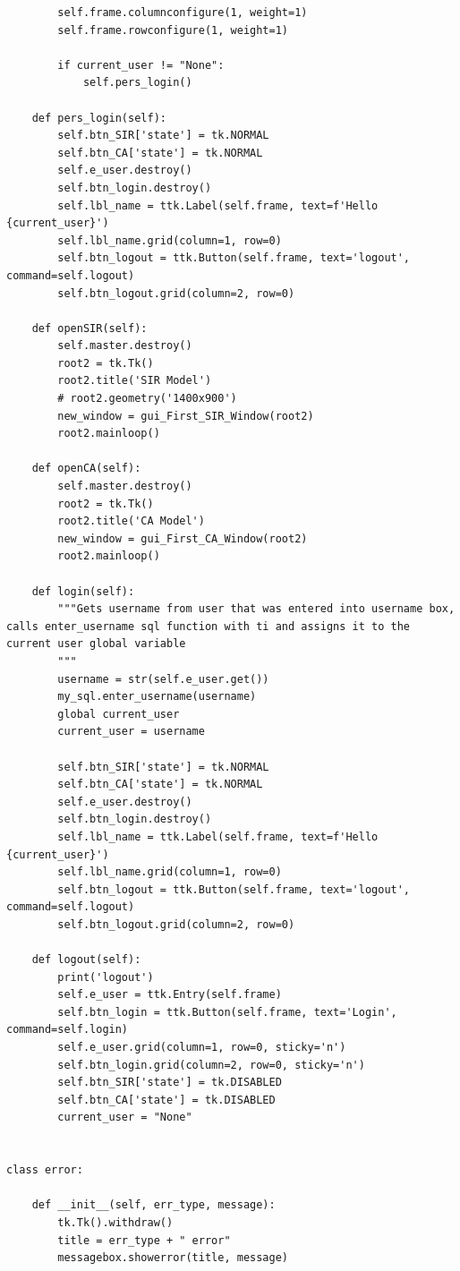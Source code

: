 \documentclass[11pt, a4paper]{article}
\begin{document}
\begin{lstlisting}
        self.frame.columnconfigure(1, weight=1)
        self.frame.rowconfigure(1, weight=1)

        if current_user != "None":
            self.pers_login()

    def pers_login(self):
        self.btn_SIR['state'] = tk.NORMAL
        self.btn_CA['state'] = tk.NORMAL
        self.e_user.destroy()
        self.btn_login.destroy()
        self.lbl_name = ttk.Label(self.frame, text=f'Hello {current_user}')
        self.lbl_name.grid(column=1, row=0)
        self.btn_logout = ttk.Button(self.frame, text='logout', command=self.logout)
        self.btn_logout.grid(column=2, row=0)

    def openSIR(self):
        self.master.destroy()
        root2 = tk.Tk()
        root2.title('SIR Model')
        # root2.geometry('1400x900')
        new_window = gui_First_SIR_Window(root2)
        root2.mainloop()

    def openCA(self):
        self.master.destroy()
        root2 = tk.Tk()
        root2.title('CA Model')
        new_window = gui_First_CA_Window(root2)
        root2.mainloop()

    def login(self):
        """Gets username from user that was entered into username box, calls enter_username sql function with ti and assigns it to the current user global variable
        """
        username = str(self.e_user.get())
        my_sql.enter_username(username)
        global current_user
        current_user = username

        self.btn_SIR['state'] = tk.NORMAL
        self.btn_CA['state'] = tk.NORMAL
        self.e_user.destroy()
        self.btn_login.destroy()
        self.lbl_name = ttk.Label(self.frame, text=f'Hello {current_user}')
        self.lbl_name.grid(column=1, row=0)
        self.btn_logout = ttk.Button(self.frame, text='logout', command=self.logout)
        self.btn_logout.grid(column=2, row=0)

    def logout(self):
        print('logout')
        self.e_user = ttk.Entry(self.frame)
        self.btn_login = ttk.Button(self.frame, text='Login', command=self.login)
        self.e_user.grid(column=1, row=0, sticky='n')
        self.btn_login.grid(column=2, row=0, sticky='n')
        self.btn_SIR['state'] = tk.DISABLED
        self.btn_CA['state'] = tk.DISABLED
        current_user = "None"


class error:

    def __init__(self, err_type, message):
        tk.Tk().withdraw()
        title = err_type + " error"
        messagebox.showerror(title, message)



\end{lstlisting}
\end{document}

